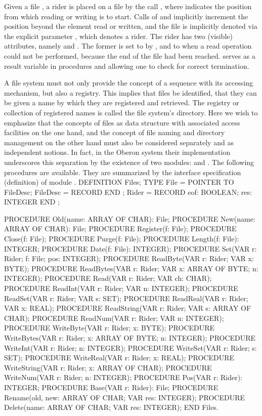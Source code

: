 Given a file , a rider  is placed on a file by the call
, where  indicates the position from which reading or writing is to start. Calls of  and  implicitly increment the position beyond the element read or written, and the file is implicitly denoted via the explicit parameter , which denotes a rider. The rider has two (visible) attributes, namely  and . The former is set to  by , and to  when a read operation could not be performed, because the end of the file had been reached.  serves as a result variable in procedures  and  allowing one to check for correct termination.

A file system must not only provide the concept of a sequence with its accessing mechanism, but also a registry. This implies that files be identified, that they can be given a name by which they are registered and retrieved. The registry or collection of registered names is called the file system's directory. Here we wish to emphasize that the concepts of files as data structure with associated access facilities on the one hand, and the concept of file naming and directory management on the other hand must also be considered separately and as independent notions. In fact, in the Oberon system their implementation underscores this separation by the existence of two modules:  and . The following procedures are available. They are summarized by the interface specification (definition) of module .
\begintt
DEFINITION Files;
  TYPE File = POINTER TO FileDesc;
     FileDesc = RECORD END ;
     Rider = RECORD eof: BOOLEAN; res: INTEGER END ;

  PROCEDURE Old(name: ARRAY OF CHAR): File;
  PROCEDURE New(name: ARRAY OF CHAR): File;
  PROCEDURE Register(f: File);
  PROCEDURE Close(f: File);
  PROCEDURE Purge(f: File);
  PROCEDURE Length(f: File): INTEGER;
  PROCEDURE Date(f: File): INTEGER);
  PROCEDURE Set(VAR r: Rider; f: File; pos: INTEGER);
  PROCEDURE ReadByte(VAR r: Rider; VAR x: BYTE);
  PROCEDURE ReadBytes(VAR r: Rider; VAR x: ARRAY OF BYTE; n: INTEGER);
  PROCEDURE Read(VAR r: Rider; VAR ch: CHAR);
  PROCEDURE ReadInt(VAR r: Rider; VAR n: INTEGER);
  PROCEDURE ReadSet(VAR r: Rider; VAR s: SET);
  PROCEDURE ReadReal(VAR r: Rider; VAR x: REAL);
  PROCEDURE ReadString(VAR r: Rider; VAR s: ARRAY OF CHAR);
  PROCEDURE ReadNum(VAR r: Rider; VAR n: INTEGER);
  PROCEDURE WriteByte(VAR r: Rider; x: BYTE);
  PROCEDURE WriteBytes(VAR r: Rider; x: ARRAY OF BYTE; n: INTEGER);
  PROCEDURE WriteInt(VAR r: Rider; n: INTEGER);
  PROCEDURE WriteSet(VAR r: Rider; s: SET);
  PROCEDURE WriteReal(VAR r: Rider; x: REAL);
  PROCEDURE WriteString(VAR r: Rider; x: ARRAY OF CHAR);
  PROCEDURE WriteNum(VAR r: Rider; n: INTEGER);
  PROCEDURE Pos(VAR r: Rider): INTEGER;
  PROCEDURE Base(VAR r: Rider): File;
  PROCEDURE Rename(old, new: ARRAY OF CHAR; VAR res: INTEGER);
  PROCEDURE Delete(name: ARRAY OF CHAR; VAR res: INTEGER);
END Files.
\endtt

